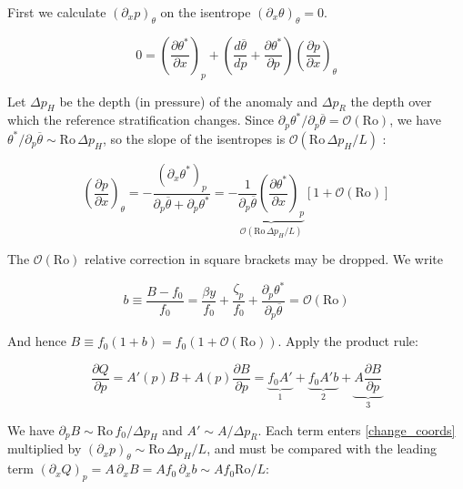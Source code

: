 \documentclass{article}
\begin{document}
First we calculate $(\partial_x p)_\theta$ on the isentrope $(\partial_x \theta)_\theta = 0$.

\begin{equation}
    0 = \left( \frac{\partial \theta ^*}{\partial x}\right)_p + \left(\frac{d\overline{\theta}}{d p} + \frac{\partial \theta^*}{\partial p}\right) \left(\frac{\partial p}{\partial x}\right)_\theta
\end{equation}

Let $\Delta p_H$ be the depth (in pressure) of the anomaly and $\Delta p_R$ the depth over which the reference stratification changes.
Since $\partial_p \theta^* / \partial_p \overline\theta = \mathcal{O}(\mathrm{Ro})$, we have $\theta^* / \partial_p \overline\theta \sim \mathrm{Ro}\, \Delta p_H$, so the slope of the isentropes is $\mathcal{O}(\mathrm{Ro}\, \Delta p_H / L)$ \cite{Vallis2017}:

\begin{equation}\label{temp_pxtheta}
    \left(\frac{\partial p}{\partial x}\right)_\theta
    = - \frac{(\partial_x \theta^*)_p}{\partial_p \overline{\theta} + \partial_p \theta^*}
    = - \underbrace{\frac{1}{\partial_p \overline{\theta}} \left( \frac{\partial \theta^*}{\partial x}\right)_p}_{\mathcal{O}(\mathrm{Ro}\, \Delta p_H / L)} \left[1 + \mathcal{O}(\mathrm{Ro})\right]
\end{equation}

The $\mathcal{O}(\mathrm{Ro})$ relative correction in square brackets may be dropped.
We write

\begin{equation}\label{b_is_O_ro}
    b \equiv \frac{B-f_0}{f_0} = \frac{\beta y}{f_0} + \frac{\zeta_p}{f_0} + \frac{\partial _p \theta^*}{\partial _p \overline\theta} = \mathcal{O}(\mathrm{Ro})
\end{equation}

And hence $B \equiv f_0(1+b)= f_0(1+\mathcal{O}(\mathrm{Ro}))$.
Apply the product rule:

\begin{equation}
    \frac{\partial Q}{\partial p} = A'(p) B + A(p)\frac{\partial B}{\partial p} =  \underbrace{f_0 A'}_{\boxed{1}} + \underbrace{f_0 A' b}_{\boxed{2}} + \underbrace{A \frac{\partial B}{\partial p}}_{\boxed{3}}
\end{equation}

We have $\partial_p B \sim \mathrm{Ro}\, f_0 / \Delta p_H$ and $A' \sim A / \Delta p_R$.
Each term enters \cref{change_coords} multiplied by $(\partial_x p)_\theta \sim \mathrm{Ro}\, \Delta p_H / L$, and must be compared with the leading term $(\partial_x Q)_p = A\, \partial_x B = A f_0\, \partial_x b \sim A f_0 \mathrm{Ro} / L$:
\end{document}
